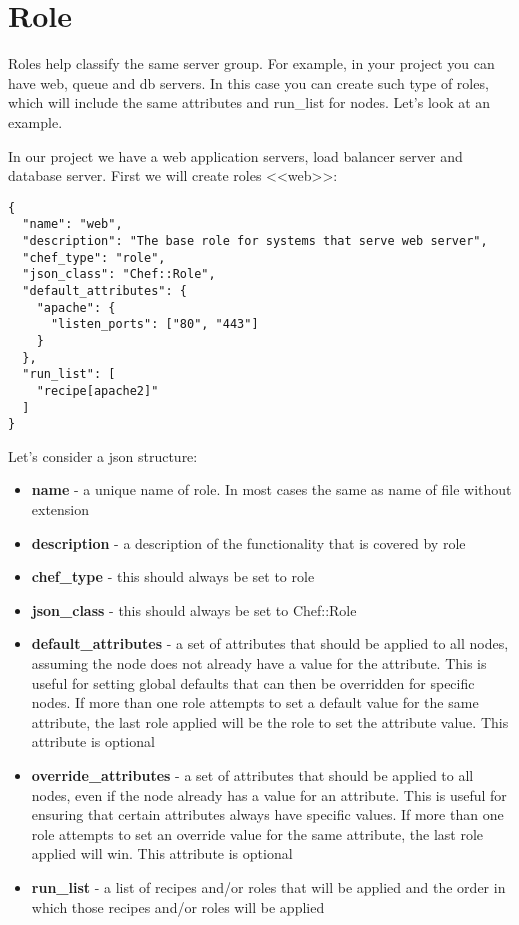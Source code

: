 \section{Role}

Roles help classify the same server group. For example, in your project you can have web, queue and db servers. In this case you can create such type of roles, which will include the same attributes and run\_list for nodes. Let's look at an example.

In our project we have a web application servers, load balancer server and database server. First we will create roles <<web>>:

\begin{lstlisting}[label=lst:my-cloud-role1,title=my-cloud/roles/web.json]
{
  "name": "web",
  "description": "The base role for systems that serve web server",
  "chef_type": "role",
  "json_class": "Chef::Role",
  "default_attributes": {
    "apache": {
      "listen_ports": ["80", "443"]
    }
  },
  "run_list": [
    "recipe[apache2]"
  ]
}
\end{lstlisting}

Let's consider a json structure:

\begin{itemize}
  \item \textbf{name} - a unique name of role. In most cases the same as name of file without extension
  \item \textbf{description} - a description of the functionality that is covered by role
  \item \textbf{chef\_type} - this should always be set to role
  \item \textbf{json\_class} - this should always be set to Chef::Role
  \item \textbf{default\_attributes} - a set of attributes that should be applied to all nodes, assuming the node does not already have a value for the attribute. This is useful for setting global defaults that can then be overridden for specific nodes. If more than one role attempts to set a default value for the same attribute, the last role applied will be the role to set the attribute value. This attribute is optional
  \item \textbf{override\_attributes} - a set of attributes that should be applied to all nodes, even if the node already has a value for an attribute. This is useful for ensuring that certain attributes always have specific values. If more than one role attempts to set an override value for the same attribute, the last role applied will win. This attribute is optional
  \item \textbf{run\_list} - a list of recipes and/or roles that will be applied and the order in which those recipes and/or roles will be applied
\end{itemize}

